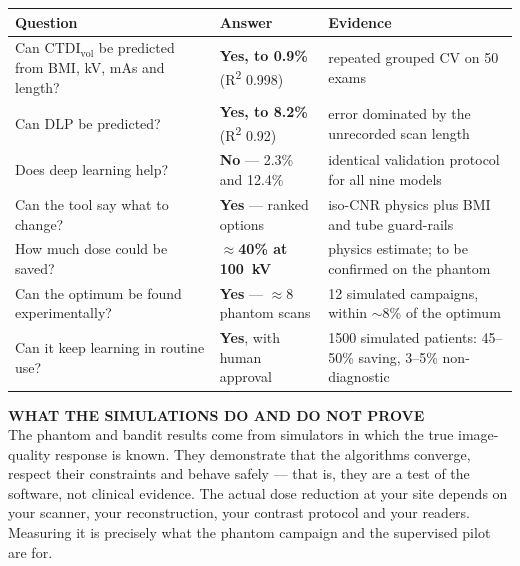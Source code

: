 \documentclass[10pt,a4paper]{article}
\newcommand{\ctdi}{\ensuremath{\mathrm{CTDI}_{\mathrm{vol}}}}
\newcommand{\hdr}{\rowcolor{ctsurf}}
\begin{document}
\begin{table}[h]\footnotesize
\begin{tabularx}{\linewidth}{@{}L l L@{}}
\toprule
\hdr \textbf{Question} & \textbf{Answer} & \textbf{Evidence}\\
\midrule
Can \ctdi{} be predicted from BMI, kV, mAs and length? & \textbf{Yes, to 0.9\%} (R\textsuperscript{2} 0.998) & repeated grouped CV on 50 exams\\
Can DLP be predicted? & \textbf{Yes, to 8.2\%} (R\textsuperscript{2} 0.92) & error dominated by the unrecorded scan length\\
Does deep learning help? & \textbf{No} --- 2.3\% and 12.4\% & identical validation protocol for all nine models\\
Can the tool say what to change? & \textbf{Yes} --- ranked options & iso-CNR physics plus BMI and tube guard-rails\\
How much dose could be saved? & \textbf{$\approx$40\% at 100~kV} & physics estimate; to be confirmed on the phantom\\
Can the optimum be found experimentally? & \textbf{Yes} --- $\approx$8 phantom scans & 12 simulated campaigns, within $\sim$8\% of the optimum\\
Can it keep learning in routine use? & \textbf{Yes}, with human approval & 1500 simulated patients: 45--50\% saving, 3--5\% non-diagnostic\\
\bottomrule
\end{tabularx}
\end{table}

\begin{warnbox}
\textbf{\footnotesize\color{ctink2}\MakeUppercase{What the simulations do and do not prove}}\\[2pt]
The phantom and bandit results come from simulators in which the true image-quality response is known. They
demonstrate that the algorithms converge, respect their constraints and behave safely --- that is, they are a test
of the software, not clinical evidence. The actual dose reduction at your site depends on your scanner, your
reconstruction, your contrast protocol and your readers. Measuring it is precisely what the phantom campaign and
the supervised pilot are for.
\end{warnbox}

\end{document}
